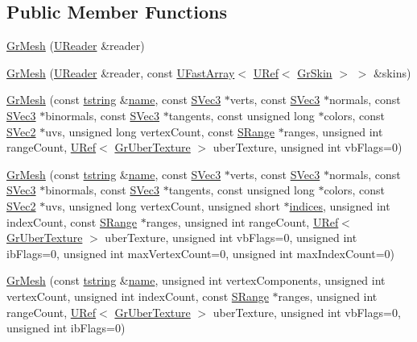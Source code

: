 \subsection*{Public Member Functions}
\begin{CompactItemize}
\item 
\hyperlink{class_gr_mesh_da12f2c59e9315aad65efd9f856e0d16}{GrMesh} (\hyperlink{class_u_reader}{UReader} \&reader)
\item 
\hyperlink{class_gr_mesh_81af8af4ed876aa87e65bab52a19f714}{GrMesh} (\hyperlink{class_u_reader}{UReader} \&reader, const \hyperlink{class_u_fast_array}{UFastArray}$<$ \hyperlink{class_u_ref}{URef}$<$ \hyperlink{class_gr_skin}{GrSkin} $>$ $>$ \&skins)
\item 
\hyperlink{class_gr_mesh_2b1dc3fccc2037163884b7d436da63a5}{GrMesh} (const \hyperlink{common__afx_8h_816fa58fd77499b0edb2c69ebe803d5c}{tstring} \&\hyperlink{glext__bak_8h_bb62efe59ccdd153ce42e1a418352209}{name}, const \hyperlink{struct_s_vec3}{SVec3} $\ast$verts, const \hyperlink{struct_s_vec3}{SVec3} $\ast$normals, const \hyperlink{struct_s_vec3}{SVec3} $\ast$binormals, const \hyperlink{struct_s_vec3}{SVec3} $\ast$tangents, const unsigned long $\ast$colors, const \hyperlink{struct_s_vec2}{SVec2} $\ast$uvs, unsigned long vertexCount, const \hyperlink{struct_gr_mesh_1_1_s_range}{SRange} $\ast$ranges, unsigned int rangeCount, \hyperlink{class_u_ref}{URef}$<$ \hyperlink{class_gr_uber_texture}{GrUberTexture} $>$ uberTexture, unsigned int vbFlags=0)
\item 
\hyperlink{class_gr_mesh_fe2182b75dc1f6a02a096cea277872f8}{GrMesh} (const \hyperlink{common__afx_8h_816fa58fd77499b0edb2c69ebe803d5c}{tstring} \&\hyperlink{glext__bak_8h_bb62efe59ccdd153ce42e1a418352209}{name}, const \hyperlink{struct_s_vec3}{SVec3} $\ast$verts, const \hyperlink{struct_s_vec3}{SVec3} $\ast$normals, const \hyperlink{struct_s_vec3}{SVec3} $\ast$binormals, const \hyperlink{struct_s_vec3}{SVec3} $\ast$tangents, const unsigned long $\ast$colors, const \hyperlink{struct_s_vec2}{SVec2} $\ast$uvs, unsigned long vertexCount, unsigned short $\ast$\hyperlink{glext__bak_8h_c4293d0f76770fe857be3431df25308d}{indices}, unsigned int indexCount, const \hyperlink{struct_gr_mesh_1_1_s_range}{SRange} $\ast$ranges, unsigned int rangeCount, \hyperlink{class_u_ref}{URef}$<$ \hyperlink{class_gr_uber_texture}{GrUberTexture} $>$ uberTexture, unsigned int vbFlags=0, unsigned int ibFlags=0, unsigned int maxVertexCount=0, unsigned int maxIndexCount=0)
\item 
\hyperlink{class_gr_mesh_9ac6adeb0a429135ddce8487e65b05e9}{GrMesh} (const \hyperlink{common__afx_8h_816fa58fd77499b0edb2c69ebe803d5c}{tstring} \&\hyperlink{glext__bak_8h_bb62efe59ccdd153ce42e1a418352209}{name}, unsigned int vertexComponents, unsigned int vertexCount, unsigned int indexCount, const \hyperlink{struct_gr_mesh_1_1_s_range}{SRange} $\ast$ranges, unsigned int rangeCount, \hyperlink{class_u_ref}{URef}$<$ \hyperlink{class_gr_uber_texture}{GrUberTexture} $>$ uberTexture, unsigned int vbFlags=0, unsigned int ibFlags=0)

\end{CompactItemize}
